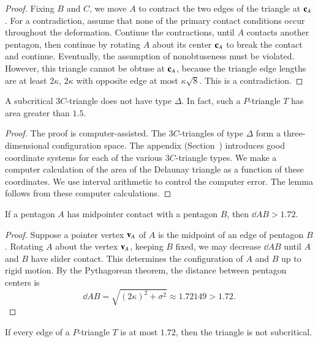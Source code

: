 \begin{proof} Fixing $B$ and $C$, we move $A$ to contract the two
  edges of the triangle at ${\mathbf c}_A$.  For a contradiction, assume that
  none of the primary contact conditions occur throughout the
  deformation.  Continue the contractions, until $A$ contacts another
  pentagon, then continue by rotating $A$ about its center ${\mathbf c}_A$ to
  break the contact and continue.  Eventually, the assumption of
  nonobtuseness must be violated.  However, this triangle cannot be
  obtuse at ${\mathbf c}_A$, because the triangle edge lengths are at least $2
  \kappa$, $2 \kappa$ with opposite edge at most
  $\kappa\sqrt{8}$. This is a contradiction.
\end{proof}

\begin{lemma} A subcritical $3C$-triangle does not have type $\Delta$.
  In fact, such a $P$-triangle $T$ has area greater than $1.5$.
\end{lemma}

\begin{proof} The proof is computer-assisted.  The $3C$-triangles of
  type $\Delta$ form a three-dimensional configuration space.  The
  appendix (Section~) introduces good coordinate
  systems for each of the various $3C$-triangle types.  We make a
  computer calculation of the area of the Delaunay triangle as a
  function of these coordinates.  We use interval arithmetic to
  control the computer error.  The lemma follows from these computer
  calculations.
\end{proof}



\begin{lemma}  
  If a pentagon $A$ has midpointer contact with a pentagon $B$, then
  $\dd{A}{B} > 1.72$.
\end{lemma}

\begin{proof} Suppose a pointer vertex ${\mathbf v}_A$ of $A$ is the midpoint of an
  edge of pentagon $B$.  Rotating $A$ about the vertex ${\mathbf v}_A$, keeping
  $B$ fixed, we may decrease $\dd{A}{B}$ until $A$ and $B$
  have slider contact.  This determines the configuration of $A$ and
  $B$ up to rigid motion.  By the Pythagorean theorem, the
  distance between pentagon centers is
\[
\dd{A}{B} = \sqrt{(2\kappa)^2 + \sigma^2} \approx 1.72149 > 1.72.
\] %
\end{proof}

\begin{lemma}
  If every edge of a $P$-triangle $T$ is at most $1.72$, then the
  triangle is not subcritical.
\end{lemma}

